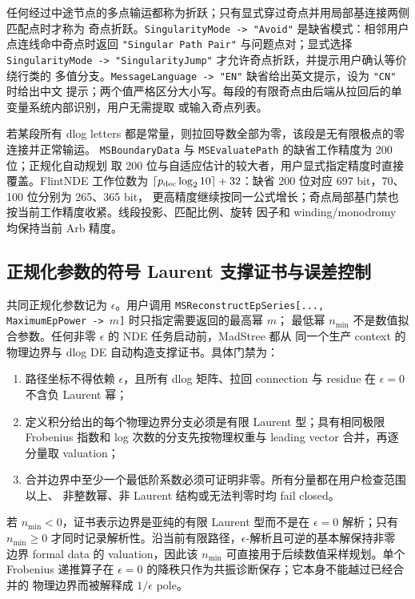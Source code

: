 \documentclass[11pt,a4paper]{ctexart}
\begin{document}
任何经过中途节点的多点输运都称为折跃；只有显式穿过奇点并用局部基连接两侧匹配点时才称为
奇点折跃。\texttt{SingularityMode -> "Avoid"} 是缺省模式：相邻用户点连线命中奇点时返回
\texttt{"Singular Path Pair"} 与问题点对；显式选择
\texttt{SingularityMode -> "SingularityJump"} 才允许奇点折跃，并提示用户确认等价绕行类的
多值分支。\texttt{MessageLanguage -> "EN"} 缺省给出英文提示，设为 \texttt{"CN"} 时给出中文
提示；两个值严格区分大小写。每段的有限奇点由后端从拉回后的单变量系统内部识别，用户无需提取
或输入奇点列表。

若某段所有 dlog letters 都是常量，则拉回导数全部为零，该段是无有限极点的零连接并正常输运。
\texttt{MSBoundaryData} 与 \texttt{MSEvaluatePath} 的缺省工作精度为 200 位；正规化自动规划
取 200 位与自适应估计的较大者，用户显式指定精度时直接覆盖。FlintNDE 工作位数为
$\lceil p_{\rm dec}\log_2 10\rceil+32$：缺省 200 位对应 697 bit，70、100 位分别为 265、365 bit，
更高精度继续按同一公式增长；奇点局部基门禁也按当前工作精度收紧。线段投影、匹配比例、旋转
因子和 winding/monodromy 均保持当前 Arb 精度。

\subsection{正规化参数的符号 Laurent 支撑证书与误差控制}

共同正规化参数记为 $\epsilon$。用户调用
\texttt{MSReconstructEpSeries[..., MaximumEpPower -> $m$]} 时只指定需要返回的最高幂 $m$；
最低幂 $n_{\min}$ 不是数值拟合参数。任何非零 $\epsilon$ 的 NDE 任务启动前，MadStree 都从
同一个生产 context 的物理边界与 dlog DE 自动构造支撑证书。具体门禁为：
\begin{enumerate}[label=\arabic*.]
  \item 路径坐标不得依赖 $\epsilon$，且所有 dlog 矩阵、拉回 connection 与 residue 在
  $\epsilon=0$ 不含负 Laurent 幂；
  \item 定义积分给出的每个物理边界分支必须是有限 Laurent 型；具有相同极限 Frobenius
  指数和 log 次数的分支先按物理权重与 leading vector 合并，再逐分量取 valuation；
  \item 合并边界中至少一个最低阶系数必须可证明非零。所有分量都在用户检查范围以上、
  非整数幂、非 Laurent 结构或无法判零时均 fail closed。
\end{enumerate}
若 $n_{\min}<0$，证书表示边界是亚纯的有限 Laurent 型而不是在 $\epsilon=0$ 解析；只有
$n_{\min}\geq0$ 才同时记录解析性。沿当前有限路径，$\epsilon$-解析且可逆的基本解保持非零
边界 formal data 的 valuation，因此该 $n_{\min}$ 可直接用于后续数值采样规划。单个
Frobenius 递推算子在 $\epsilon=0$ 的降秩只作为共振诊断保存；它本身不能越过已经合并的
物理边界而被解释成 $1/\epsilon$ pole。
\end{document}
